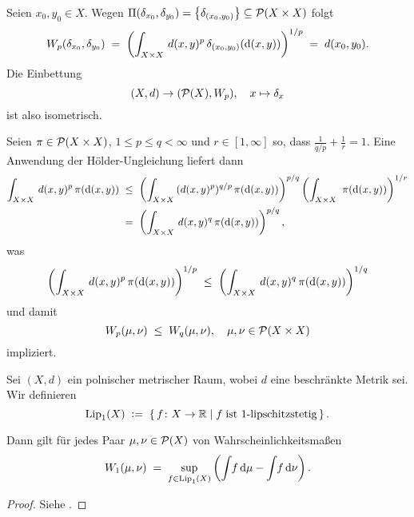 \documentclass[../main/main.tex]{subfiles}
\begin{document}
	\begin{Bemerkung}
		Seien $x_0, y_0 \in X$. Wegen $\Pi(\delta_{x_0}, \delta_{y_0}) = \left\{\delta_{(x_0, y_0)}\right\} \subseteq \mathcal{P}(X \times X)$ folgt
		\[ W_p(\delta_{x_0}, \delta_{y_0}) \; = \; \left( \int_{X \times X} \, d(x, y)^p \, \delta_{(x_0, y_0)}(\mathrm{d}(x, y)) \right)^{1/p} \; = \; d(x_0, y_0) \text{.} \]
		Die Einbettung 
		\[ (X, d) \to (\mathcal{P}(X), W_p), \quad x \mapsto \delta_x \]
		ist also isometrisch.
	\end{Bemerkung}

	\begin{Bemerkung}
		Seien $\pi \in \mathcal{P}(X \times X)$, $1 \leq p \leq q < \infty$ und $r \in [1, \infty]$ so, dass $\frac{1}{q/p} + \frac{1}{r} = 1$. Eine Anwendung der Hölder-Ungleichung liefert dann
		\begin{align*}
			\int_{X \times X} \, d(x, y)^p \, \pi(\mathrm{d}(x, y)) \; &\leq \; \left( \int_{X \times X} \, (d(x, y)^p)^{q/p} \, \pi(\mathrm{d}(x, y)) \right)^{p/q} \left( \int_{X \times X} \,  \, \pi(\mathrm{d}(x, y)) \right)^{1/r} \\
			                                                    &=    \; \left( \int_{X \times X} \, d(x, y)^q \, \pi(\mathrm{d}(x, y)) \right)^{p/q} \text{,}
		\end{align*}
		was
		\[ \left( \int_{X \times X} \, d(x, y)^p \, \pi(\mathrm{d}(x, y)) \right)^{1/p} \; \leq \; \left( \int_{X \times X} \, d(x, y)^q \, \pi(\mathrm{d}(x, y)) \right)^{1/q} \]
		und damit
		\[ W_p(\mu, \nu) \; \leq \; W_q(\mu, \nu), \quad \mu, \nu \in \mathcal{P}(X \times X) \]
		impliziert.
	\end{Bemerkung}

	\begin{Satz}
		\label{thm:kantorovichrubinstein}
		Sei $(X, d)$ ein polnischer metrischer Raum, wobei $d$ eine beschränkte Metrik sei. Wir definieren
		\[ \mathrm{Lip}_1(X) \; \vcentcolon = \; \left\{\, f \colon X \to \mathbb{R} \; \middle| \; f \; \text{ist }1\text{-lipschitzstetig}  \,\right\} \text{.} \]
		
		Dann gilt für jedes Paar $\mu, \nu \in \mathcal{P}(X)$ von Wahrscheinlichkeitsmaßen
		\[ W_1(\mu, \nu) \; = \; \sup_{f \in \mathrm{Lip}_1(X)} \left( \int_{} \, f \, \mathrm{d}\mu - \int_{} \, f \, \mathrm{d}\nu \right) \text{.} \]
	\end{Satz}

	\begin{proof}
		Siehe \cite[Bemerkung 6.5]{Villani.2009}.
	\end{proof}
\end{document}
